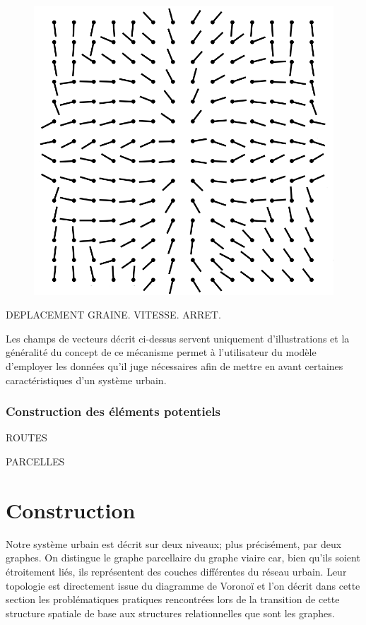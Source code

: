 \documentclass[12pt]{article}
\begin{document}
\begin{figure}[!ht]
  \centering
  \includegraphics[width=.8\linewidth]{images/vf-sum.png}
  \caption{}
  \label{fig:field-sum}
\end{figure}

DEPLACEMENT GRAINE. VITESSE. ARRET.

Les champs de vecteurs décrit ci-dessus servent uniquement
d'illustrations et la généralité du concept de ce mécanisme permet à
l'utilisateur du modèle d'employer les données qu'il juge nécessaires
afin de mettre en avant certaines caractéristiques d'un système
urbain.

\subsubsection{Construction des éléments potentiels}

ROUTES

PARCELLES

\section{Construction}

Notre système urbain est décrit sur deux niveaux; plus précisément,
par deux graphes. On distingue le graphe parcellaire du graphe viaire
car, bien qu'ils soient étroitement liés, ils représentent des couches
différentes du réseau urbain. Leur topologie est directement issue du
diagramme de Voronoï et l'on décrit dans cette section les
problématiques pratiques rencontrées lors de la transition de cette
structure spatiale de base aux structures relationnelles que sont les
graphes.
\end{document}
